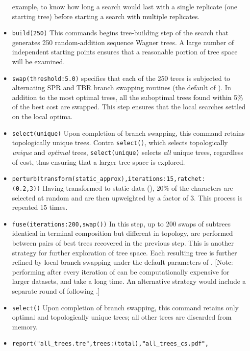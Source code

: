 \begin{itemize}
example, to know how long a search would last with a single replicate
(one starting tree) before starting a search with multiple replicates.
\item \texttt{build(250)} This commands begins tree-building step
of the search that generates 250 random-addition sequence Wagner
trees. A large number of independent starting points ensures that
a reasonable portion of tree space will be examined.  
\item \texttt{swap(threshold:5.0)}  specifies that each
of the 250 trees is subjected to alternating SPR and TBR branch
swapping routines (the default of \poy).  In addition to the most
optimal trees, all the suboptimal trees found within 5\% of the
best cost are swapped. This step ensures that the local searches 
settled on the local  optima.
\item \texttt{select(unique)} Upon completion of branch swapping,
this command retains topologically unique trees.  Contra
\texttt{select()}, which selects topologically \emph{unique} and
\emph{optimal} trees,  \texttt{select(unique)} selects \emph{all}
unique trees, regardless of cost, thus ensuring that a larger tree
space is explored.  
\item \texttt{perturb(transform(static\_approx),iterations:15,ratchet:\\(0.2,3))}
Having transformed to static data (),
20\% of the characters are selected at random and are then upweighted
by a factor of $3$.  This process is repeated 15 times.  
\item \texttt{fuse(iterations:200,swap())} In this step, up to 200 swaps
of subtrees identical in terminal composition but different in
topology, are performed between pairs of best trees recovered in
the previous step. This is another strategy for further exploration
of tree space. Each resulting tree is further refined by local
branch swapping under the default parameters of .
[Note: performing  after every iteration of
 can be computationally expensive for larger
datasets, and take a long time. An alternative strategy would include
a separate round of  following .]
\item \texttt{select()} Upon completion of branch swapping, this
command retains only optimal and topologically unique trees; all
other trees are discarded from memory.  
\item \texttt{report("all\_trees.tre",trees:(total),"all\_trees\_cs.pdf",\\
}
\end{itemize}
